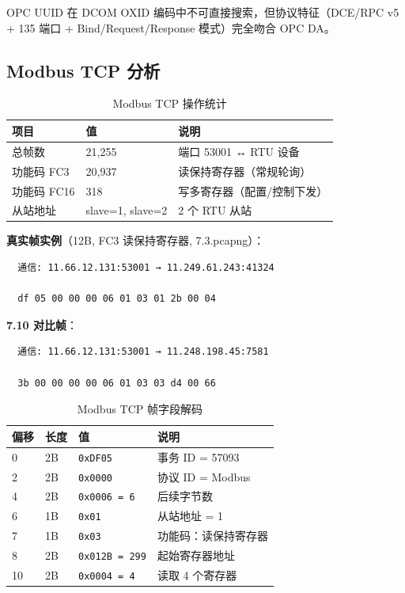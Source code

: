 \documentclass[12pt,a4paper]{ctexart}
\newcommand{\code}[1]{\texttt{\small #1}}
\begin{document}
OPC UUID 在 DCOM OXID 编码中不可直接搜索，但协议特征（DCE/RPC v5 + 135 端口 + Bind/Request/Response 模式）完全吻合 OPC DA。

\subsection{Modbus TCP 分析}

\begin{table}[H]\centering
\caption{Modbus TCP 操作统计}
\begin{tabular}{p{3cm} p{2cm} p{8cm}}
\toprule
\textbf{项目} & \textbf{值} & \textbf{说明} \\
\midrule
总帧数 & 21,255 & 端口 53001 ↔ RTU 设备 \\
功能码 FC3 & 20,937 & 读保持寄存器（常规轮询） \\
功能码 FC16 & 318 & 写多寄存器（配置/控制下发） \\
从站地址 & slave=1, slave=2 & 2 个 RTU 从站 \\
\bottomrule
\end{tabular}
\end{table}

\textbf{真实帧实例}（12B, FC3 读保持寄存器, 7.3.pcapng）：

\begin{verbatim}
  通信: 11.66.12.131:53001 → 11.249.61.243:41324

  df 05 00 00 00 06 01 03 01 2b 00 04
\end{verbatim}

\textbf{7.10 对比帧}：

\begin{verbatim}
  通信: 11.66.12.131:53001 → 11.248.198.45:7581

  3b 00 00 00 00 06 01 03 03 d4 00 66
\end{verbatim}

\begin{table}[H]\centering
\caption{Modbus TCP 帧字段解码}
\begin{tabular}{p{2cm} p{1.5cm} p{2.5cm} p{6cm}}
\toprule
\textbf{偏移} & \textbf{长度} & \textbf{值} & \textbf{说明} \\
\midrule
0 & 2B & \code{0xDF05} & 事务 ID = 57093 \\
2 & 2B & \code{0x0000} & 协议 ID = Modbus \\
4 & 2B & \code{0x0006 = 6} & 后续字节数 \\
6 & 1B & \code{0x01} & 从站地址 = 1 \\
7 & 1B & \code{0x03} & 功能码：读保持寄存器 \\
8 & 2B & \code{0x012B = 299} & 起始寄存器地址 \\
10 & 2B & \code{0x0004 = 4} & 读取 4 个寄存器 \\
\bottomrule
\end{tabular}
\end{table}
\end{document}
